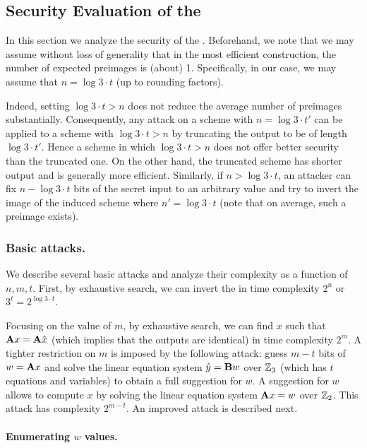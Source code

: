 \subsection{Security Evaluation of the \ttOWF}

In this section we analyze the security of the \ttOWF.
Beforehand, we note that we may assume without loss of generality that in the most efficient construction, the number of expected preimages is (about) 1. Specifically, in our case, we may assume that $n = \log 3 \cdot t$ (up to rounding factors).

Indeed, setting $\log 3 \cdot t > n$ does not reduce the average number of preimages substantially. Consequently, any attack on a scheme with $n = \log 3 \cdot t'$ can be applied to a scheme with $\log 3 \cdot t > n$ by truncating the output to be of length $\log 3 \cdot t'$. Hence a scheme in which $\log 3 \cdot t > n$ does not offer better security than the truncated one.
On the other hand, the truncated scheme has shorter output and is generally more efficient.
Similarly, if $n > \log 3 \cdot t$, an attacker can fix $n - \log 3 \cdot t$ bits of the secret input to an arbitrary value and try to invert the image of the induced scheme where $n' = \log 3 \cdot t$ (note that on average, such a preimage exists).


\subsubsection{Basic attacks.}
We describe several basic attacks and analyze their complexity as a function of $n,m,t$.
First, by exhaustive search, we can invert the \ttOWF in time complexity $2^n$ or $3^t = 2^{\log 3 \cdot t}$.

Focusing on the value of $m$, by exhaustive search, we can find $x$ such that $\mat{A}x = \mat{A}\hat{x}$ (which implies that the outputs are identical) in time complexity $2^m$.
A tighter restriction on $m$ is imposed by the following attack: guess $m - t$ bits of $w = \mat{A}x$ and solve the linear equation system $\hat{y} = \mat{B}w$ over $\mathbb{Z}_3$ (which has $t$ equations and variables) to obtain a full suggestion for $w$. A suggestion for $w$ allows to compute $x$ by solving the linear equation system $\mat{A}x=w$ over $\mathbb{Z}_2$. This attack has complexity $2^{m-t}$. An improved attack is described next.

\paragraph{Enumerating $w$ values.}

